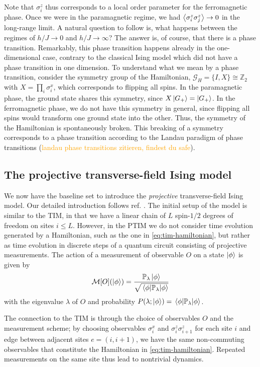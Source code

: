 Note that $\sigma_i^z$ thus corresponds to a local order parameter for the
ferromagnetic phase. Once we were in the paramagnetic regime, we had
$\expval{\sigma_i^z\sigma_j^z}\to 0$ in the long-range limit. A natural
question to follow is, what happens between the regimes of
$h /J \to 0$ and $h /J \to \infty$? The answer is, of course, that there is a phase
transition. Remarkably, this phase transition happens already in the
one-dimensional case, contrary to the classical Ising model which did not have a phase
transition in one dimension. To understand what we mean by a phase 
transition, consider the symmetry group of the Hamiltonian, $\mathcal{G}_H =
\{I, X\} \cong \mathbb{Z}_2$ with $X = \prod_i \sigma_i^x$, which
corresponds to flipping all spins. In the paramagnetic phase, the ground state
shares this symmetry, since $X\ket{G_+} = \ket{G_+}$. In the ferromagnetic
phase, we do not have this symmetry in general, since flipping all spins would
transform one ground state into the other. Thus, the symmetry of the
Hamiltonian is spontaneously broken. This breaking of a symmetry corresponds to
a phase transition according to the Landau paradigm of phase transitions
(\textcolor{orange}{landau phase transitions zitieren, findest du safe}).
\subsection{The projective transverse-field Ising model}\label{sec:the-ptim}
We now have the baseline set to introduce the \emph{projective}
transverse-field Ising model. Our detailed introduction follows ref.
\cite{langEntanglementTransitionProjective2020}. 
The initial setup of the model is similar to the
TIM, in that we have a linear chain of $L$ spin-$1 /2$ degrees of freedom on sites
$i\leq L$. However, in the PTIM we do not consider time evolution generated by
a Hamiltonian, such as the one in \cref{eq:tim-hamiltonian}, but rather as time
evolution in discrete steps of a quantum circuit consisting of projective
measurements. The action of a measurement of observable $O$ on a state
$\ket{\phi}$ is given by
\begin{align}
  \mathcal{M}[O](\ket{\phi}) =
  \frac{\mathbb{P}_\lambda\ket{\phi}}{\sqrt{\expval{\mathbb{P}_\lambda}{\phi}}}
\end{align}
with the eigenvalue $\lambda$ of $O$ and probability $P(\lambda;
\ket{\phi}) = \expval{\mathbb{P}_\lambda}{\phi}$.

The connection to the TIM is through the choice of observables $O$ and the
measurement scheme; by choosing
observables $\sigma^x_i$ and $\sigma_i^z\sigma_{i+1}^z$ for each site $i$ and
edge between adjacent sites $e=(i,i+1)$, we have the same non-commuting observables that
constitute the Hamiltonian in \cref{eq:tim-hamiltonian}. Repeated measurements
on the same site thus lead to nontrivial dynamics.

